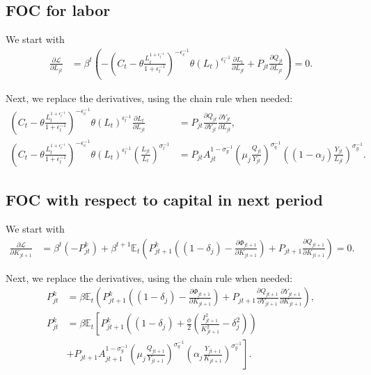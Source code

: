 \subsection{FOC for labor}

We start with
\begin{align*}
\frac{\partial\mathcal{{L}}}{\partial L_{jt}} & =\beta^{t}\left(-\left(C_{t}-\theta\frac{L_{t}^{1+\epsilon_{l}^{-1}}}{1+\epsilon_{l}^{-1}}\right)^{-\epsilon_{c}^{-1}}\theta\left(L_{t}\right)^{\epsilon_{l}^{-1}}\frac{\partial L_{t}}{\partial L_{jt}}+P_{jt}\frac{\partial Q_{jt}}{\partial L_{jt}}\right)=0.
\end{align*}

Next, we replace the derivatives, using the chain rule when needed:
\begin{align*}
\left(C_{t}-\theta\frac{L_{t}^{1+\epsilon_{l}^{-1}}}{1+\epsilon_{l}^{-1}}\right)^{-\epsilon_{c}^{-1}}\theta\left(L_{t}\right)^{\epsilon_{l}^{-1}}\frac{\partial L_{t}}{\partial L_{jt}} & =P_{jt}\frac{\partial Q_{jt}}{\partial Y_{jt}}\frac{\partial Y_{jt}}{\partial L_{jt}},\\
\left(C_{t}-\theta\frac{L_{t}^{1+\epsilon_{l}^{-1}}}{1+\epsilon_{l}^{-1}}\right)^{-\epsilon_{c}^{-1}}\theta\left(L_{t}\right)^{\epsilon_{l}^{-1}}\left(\frac{{L_{jt}}}{L_{t}}\right)^{\sigma_{l}^{-1}} & =P_{jt}A_{jt}^{1-\sigma_{y}^{-1}}\left(\mu_{j}\frac{{Q_{jt}}}{Y_{jt}}\right)^{\sigma_{q}^{-1}}\left(\left(1-\alpha_{j}\right)\frac{{Y_{jt}}}{L_{jt}}\right)^{\sigma_{y}^{-1}}.
\end{align*}


\subsection{FOC with respect to capital in next period}

We start with
\begin{align*}
\frac{\partial\mathcal{{L}}}{\partial K_{jt+1}} & =\beta^{t}\left(-P_{jt}^{k}\right)+\beta^{t+1}\mathbb{{E}}_{t}\left(P_{jt+1}^{k}\left((1-\delta_{j})-\frac{\partial\Phi_{jt+1}}{\partial K_{jt+1}}\right)+P_{jt+1}\frac{\partial Q_{jt+1}}{\partial K_{jt+1}}\right)=0.
\end{align*}

Next, we replace the derivatives, using the chain rule when needed:
\begin{align*}
P_{jt}^{k} & =\beta\mathbb{{E}}_{t}\left(P_{jt+1}^{k}\left((1-\delta_{j})-\frac{\partial\Phi_{jt+1}}{\partial K_{jt+1}}\right)+P_{jt+1}\frac{\partial Q_{jt+1}}{\partial Y_{jt+1}}\frac{\partial Y_{jt+1}}{\partial K_{jt+1}}\right),\\
P_{jt}^{k} & =\beta\mathbb{{E}}_{t}\left[P_{jt+1}^{k}\left((1-\delta_{j})+\frac{\phi}{2}\left(\frac{I_{jt+1}^{2}}{K_{jt+1}^{2}}-\delta_{j}^{2}\right)\right)\right. \\
 & \left.+P_{jt+1}A_{jt+1}^{1-\sigma_{y}^{-1}}\left(\mu_{j}\frac{{Q_{jt+1}}}{Y_{jt+1}}\right)^{\sigma_{q}^{-1}}\left(\alpha_{j}\frac{{Y_{jt+1}}}{K_{jt+1}}\right)^{\sigma_{y}^{-1}}\right].
\end{align*}


